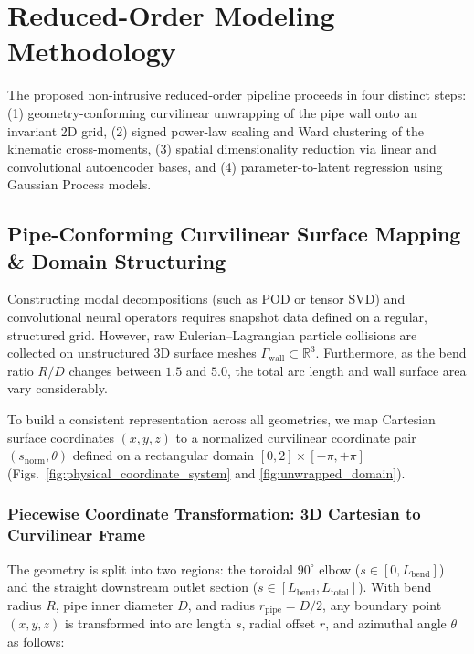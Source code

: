 \documentclass{article}
\newcommand{\real}{\mathbb{R}}
\begin{document}
\section{Reduced-Order Modeling Methodology}
\label{sec:methodology}

The proposed non-intrusive reduced-order pipeline proceeds in four distinct steps: (1) geometry-conforming curvilinear unwrapping of the pipe wall onto an invariant 2D grid, (2) signed power-law scaling and Ward clustering of the kinematic cross-moments, (3) spatial dimensionality reduction via linear and convolutional autoencoder bases, and (4) parameter-to-latent regression using Gaussian Process models.

\subsection{Pipe-Conforming Curvilinear Surface Mapping \& Domain Structuring}
\label{sec:curvilinear_mapping}

Constructing modal decompositions (such as POD or tensor SVD) and convolutional neural operators requires snapshot data defined on a regular, structured grid. However, raw Eulerian--Lagrangian particle collisions are collected on unstructured 3D surface meshes $\Gamma_{\text{wall}} \subset \real^3$. Furthermore, as the bend ratio $R/D$ changes between $1.5$ and $5.0$, the total arc length and wall surface area vary considerably.

To build a consistent representation across all geometries, we map Cartesian surface coordinates $(x,y,z)$ to a normalized curvilinear coordinate pair $(s_{\text{norm}}, \theta)$ defined on a rectangular domain $[0, 2] \times [-\pi, +\pi]$ (Figs.~\ref{fig:physical_coordinate_system} and \ref{fig:unwrapped_domain}).

\subsubsection{Piecewise Coordinate Transformation: 3D Cartesian to Curvilinear Frame}
The geometry is split into two regions: the toroidal $90^\circ$ elbow ($s \in [0, L_{\text{bend}}]$) and the straight downstream outlet section ($s \in [L_{\text{bend}}, L_{\text{total}}]$). With bend radius $R$, pipe inner diameter $D$, and radius $r_{\text{pipe}} = D/2$, any boundary point $(x,y,z)$ is transformed into arc length $s$, radial offset $r$, and azimuthal angle $\theta$ as follows:
\end{document}
